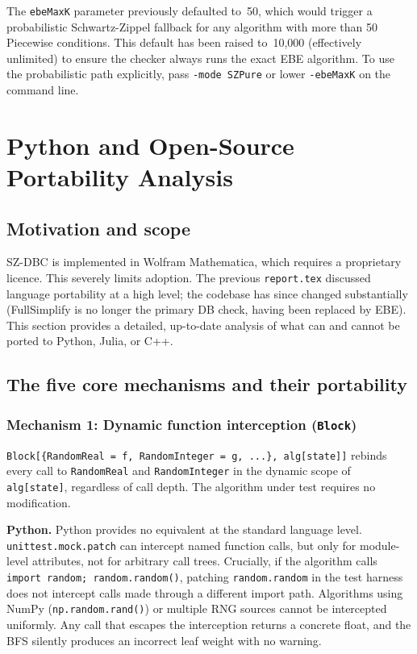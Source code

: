 \documentclass[12pt,a4paper]{article}
\theoremstyle{critical}
\theoremstyle{remark}
\theoremstyle{verified}
\begin{document}
The \texttt{ebeMaxK} parameter previously defaulted to~50, which would trigger
a probabilistic Schwartz-Zippel fallback for any algorithm with more than 50
Piecewise conditions.  This default has been raised to~10{,}000 (effectively
unlimited) to ensure the checker always runs the exact EBE algorithm.  To use the
probabilistic path explicitly, pass \texttt{-mode SZPure} or lower
\texttt{-ebeMaxK} on the command line.

\section{Python and Open-Source Portability Analysis}
\label{sec:portability}

\subsection{Motivation and scope}

SZ-DBC is implemented in Wolfram Mathematica, which requires a proprietary
licence.  This severely limits adoption.  The previous \texttt{report.tex}
discussed language portability at a high level; the codebase has since changed
substantially (FullSimplify is no longer the primary DB check, having been
replaced by EBE).  This section provides a detailed, up-to-date analysis of what
can and cannot be ported to Python, Julia, or C++.

\subsection{The five core mechanisms and their portability}

\subsubsection{Mechanism 1: Dynamic function interception (\texttt{Block})}

\texttt{Block[\{RandomReal = f, RandomInteger = g, ...\}, alg[state]]} rebinds
every call to \texttt{RandomReal} and \texttt{RandomInteger} in the dynamic scope
of \texttt{alg[state]}, regardless of call depth.  The algorithm under test
requires no modification.

\textbf{Python.}  Python provides no equivalent at the standard language level.
\texttt{unittest.mock.patch} can intercept named function calls, but only for
module-level attributes, not for arbitrary call trees.  Crucially, if the
algorithm calls \texttt{import random; random.random()}, patching
\texttt{random.random} in the test harness does not intercept calls made through
a different import path.  Algorithms using NumPy (\texttt{np.random.rand()}) or
multiple RNG sources cannot be intercepted uniformly.  Any call that escapes the
interception returns a concrete float, and the BFS silently produces an incorrect
leaf weight with no warning.
\end{document}
